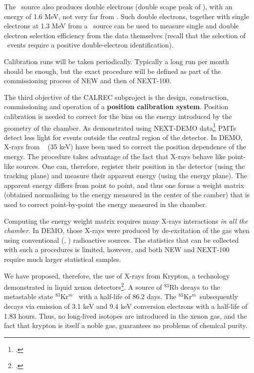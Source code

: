 The \TL\ source also produces double electrons (double scape peak of \TL), with an energy of 1.6 MeV, not very far from \Qbb. Such double electrons, together with single electrons at 1.3 MeV from a \NA\ source can be used to measure single and double electron selection efficiency from the data themselves (recall that the selection of \bb\ events require a positive double-electron identification).

Calibration runs will be taken periodically. Typically a long run per month should be enough, but the exact procedure will be defined as part of the commissioning process of NEW and then of NEXT-100. 

The third objective of the CALREC subproject is the design, construction, commissioning and operation of a {\bf position calibration system}. Position calibration is needed to correct for the bias on the energy introduced by the geometry of the chamber. As demonstrated using NEXT-DEMO data\footcite{Lorca:2014sra} PMTs detect less light for events outside the central region of the detector. In DEMO, X-rays from \Xe ~ (35 keV) have been used to correct the position dependence of the energy. The procedure takes advantage of the fact that X-rays behave like point-like sources. One can, therefore, register their position in the detector (using the tracking plane) and measure their apparent energy (using the energy plane). The apparent energy differs from point to point, and thus one forms a weight matrix  (obtained normalising to the energy measured in the center of the camber) that is used to correct point-by-point the energy measured in the chamber.

Computing the energy weight matrix requires many X-rays interactions {\em in all the chamber}. In DEMO, those X-rays were produced by de-excitation of the gas when using conventional (\NA, \CS) radioactive sources. The statistics that can be collected with such a procedures is limited, however, and both NEW and NEXT-100 require much larger statistical samples.

We have proposed, therefore, the use of X-rays from Krypton, a technology demonstrated in liquid xenon detectors\footcite{Kastens:2009rt}. A source of $^{83}$Rb
decays to the metastable state  $^{83}$Kr$^m$~ with a half-life of 86.2 days. The
$^{83}$Kr$^m$~subsequently decays via emission of 3.1 keV and 9.4 keV conversion electrons with a half-life of 1.83 hours. Thus, no long-lived isotopes are introduced in the xenon gas, and the fact that krypton is itself a noble gas, guarantees no problems of chemical purity.  

